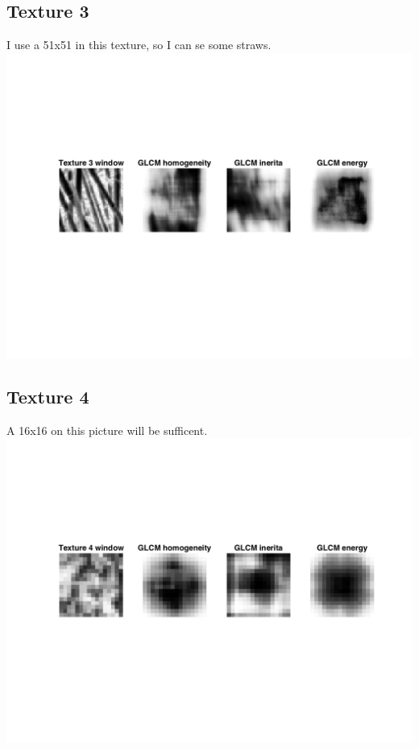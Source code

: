 \documentclass{article}
\begin{document}
\subsection{Texture 3}
I use a 51x51 in this texture, so I can se some straws. \\
\includegraphics[trim=75 140 0 140,clip,totalheight=5cm]{tw3plot.png}
\subsection{Texture 4}
A 16x16 on this picture will be sufficent. \\
\includegraphics[trim=75 140 0 140,clip,totalheight=5cm]{tw4plot.png}
\end{document}

